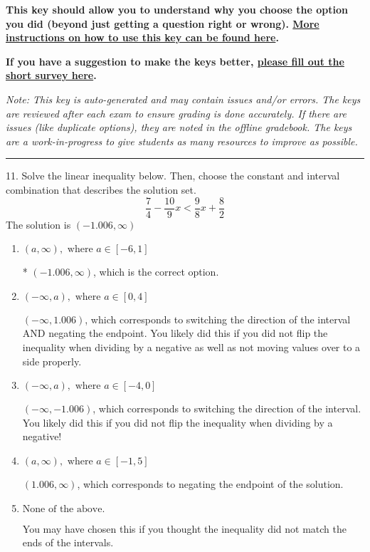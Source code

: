 \documentclass{article}[14pt]
\begin{document}
\textbf{This key should allow you to understand why you choose the option you did (beyond just getting a question right or wrong). \href{https://xronos.clas.ufl.edu/mac1105spring2020/courseDescriptionAndMisc/Exams/LearningFromResults}{More instructions on how to use this key can be found here}.}

\textbf{If you have a suggestion to make the keys better, \href{https://forms.gle/CZkbZmPbC9XALEE88}{please fill out the short survey here}.}

\textit{Note: This key is auto-generated and may contain issues and/or errors. The keys are reviewed after each exam to ensure grading is done accurately. If there are issues (like duplicate options), they are noted in the offline gradebook. The keys are a work-in-progress to give students as many resources to improve as possible.}

\rule{\textwidth}{0.4pt}

11. Solve the linear inequality below. Then, choose the constant and interval combination that describes the solution set.
$$ \frac{7}{4} - \frac{10}{9} x < \frac{9}{8} x + \frac{8}{2} $$ 
The solution is $ (-1.006, \infty) $ 

\begin{enumerate}[label=\Alph*.] 
\item $ (a, \infty), \text{ where } a \in [-6, 1] $ 

 * $(-1.006, \infty)$, which is the correct option. 
\item $ (-\infty, a), \text{ where } a \in [0, 4] $ 

  $(-\infty, 1.006)$, which corresponds to switching the direction of the interval AND negating the endpoint. You likely did this if you did not flip the inequality when dividing by a negative as well as not moving values over to a side properly. 
\item $ (-\infty, a), \text{ where } a \in [-4, 0] $ 

  $(-\infty, -1.006)$, which corresponds to switching the direction of the interval. You likely did this if you did not flip the inequality when dividing by a negative! 
\item $ (a, \infty), \text{ where } a \in [-1, 5] $ 

  $(1.006, \infty)$, which corresponds to negating the endpoint of the solution. 
\item $ \text{None of the above}. $ 

 You may have chosen this if you thought the inequality did not match the ends of the intervals. 
\end{enumerate} 
 
\end{document}
